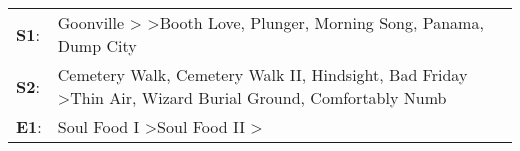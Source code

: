 \begin{supertabular}{p{0.03\textwidth}p{0.92\textwidth}}
 \textbf{S1}:  &                         Goonville\textsuperscript{} \textgreater {}\textsuperscript{} \textgreater \enspace Booth Love\textsuperscript{}, \enspace Plunger\textsuperscript{}, \enspace Morning Song\textsuperscript{}, \enspace Panama\textsuperscript{}, \enspace Dump City\textsuperscript{}  \enspace  \\
 \textbf{S2}:  &  Cemetery Walk\textsuperscript{}, \enspace Cemetery Walk II\textsuperscript{}, \enspace Hindsight\textsuperscript{}, \enspace Bad Friday\textsuperscript{} \textgreater \enspace Thin Air\textsuperscript{}, \enspace Wizard Burial Ground\textsuperscript{}, \enspace Comfortably Numb\textsuperscript{}  \enspace  \\
 \textbf{E1}:  &                                                                                                                                                                           Soul Food I\textsuperscript{} \textgreater \enspace Soul Food II\textsuperscript{} \textgreater {}\textsuperscript{}  \enspace  \\
\end{supertabular}
